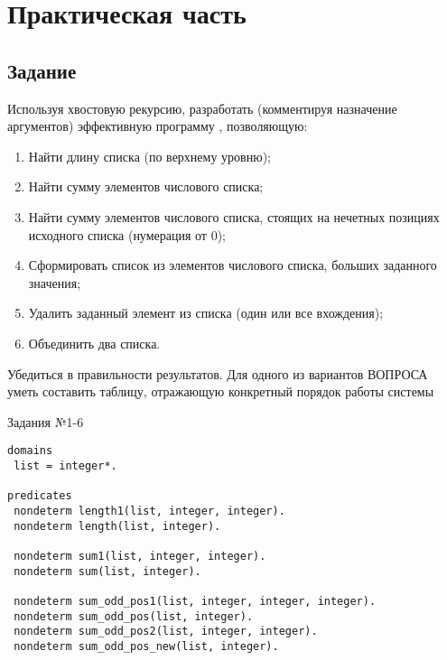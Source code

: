 \setcounter{page}{3}

\chapter{Практическая часть}
\section{Задание}
Используя хвостовую рекурсию, разработать (комментируя назначение
аргументов) эффективную программу , позволяющую:
\begin{enumerate}
	\item Найти длину списка (по верхнему уровню);
	\item Найти сумму элементов числового списка;
	\item Найти сумму элементов числового списка, стоящих на нечетных позициях исходного списка (нумерация от 0);
	\item Сформировать список из элементов числового списка, больших заданного значения;
	\item Удалить заданный элемент из списка (один или все вхождения);
	\item Объединить два списка.
\end{enumerate}

Убедиться в правильности результатов.
Для одного из вариантов ВОПРОСА уметь составить таблицу, отражающую конкретный порядок работы системы
  
\begin{code}
\caption{Задания №1-6}
\label{code:bf1}
\begin{verbatim}
domains 
 list = integer*.

predicates
 nondeterm length1(list, integer, integer).
 nondeterm length(list, integer).
 
 nondeterm sum1(list, integer, integer).
 nondeterm sum(list, integer).
 
 nondeterm sum_odd_pos1(list, integer, integer, integer).
 nondeterm sum_odd_pos(list, integer).
 nondeterm sum_odd_pos2(list, integer, integer).
 nondeterm sum_odd_pos_new(list, integer).
\end{verbatim}
\end{code}

\newpage

